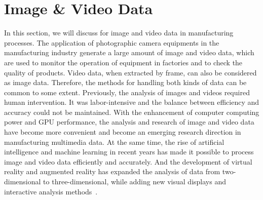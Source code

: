 \documentclass[a4paper,fleqn]{cas-dc}
\begin{document}
\section{Image \& Video Data}
In this section, we will discuss for image and video data in manufacturing processes.
The application of photographic camera equipments in the manufacturing industry generate a large amount of image and video data, which are used to monitor the operation of equipment in factories and to check the quality of products.
Video data, when extracted by frame, can also be considered as image data. Therefore, the methods for handling both kinds of data can be common to some extent.
Previously, the analysis of images and videos required human intervention. It was labor-intensive and the balance between efficiency and accuracy could not be maintained.
With the enhancement of computer computing power and GPU performance, the analysis and research of image and video data have become more convenient and become an emerging research direction in manufacturing multimedia data.
At the same time, the rise of artificial intelligence and machine learning in recent years has made it possible to process image and video data efficiently and accurately.
And the development of virtual reality and augmented reality has expanded the analysis of data from two-dimensional to three-dimensional, while adding new visual displays and interactive analysis methods~\cite{Yoo2021}.



\end{document}
